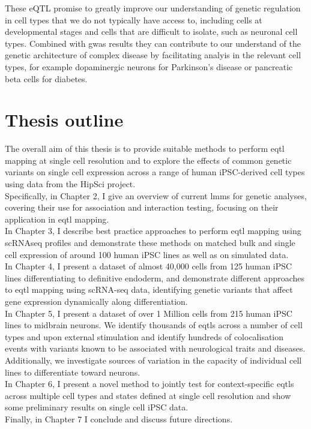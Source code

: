 These eQTL promise to greatly improve our understanding of genetic regulation in cell types that we do not typically have access to, including cells at developmental stages and cells that are difficult to isolate, such as neuronal cell types.
Combined with \gls{gwas} results they can contribute to our understand of the genetic architecture of complex disease by facilitating analyis in the relevant cell types, for example dopaminergic neurons for Parkinson's disease or pancreatic beta cells for diabetes.


\newpage

\section{Thesis outline}

The overall aim of this thesis is to provide suitable methods to perform \gls{eqtl} mapping at single cell resolution and to explore the effects of common genetic variants on single cell expression across a range of human iPSC-derived cell types using data from the HipSci project.\\

Specifically, in Chapter 2, I give an overview of current \glspl{lmm} for genetic analyses, covering their use for association and interaction testing, focusing on their application in \gls{eqtl} mapping.\\

In Chapter 3, I describe best practice approaches to perform \gls{eqtl} mapping using scRNAseq profiles and demonstrate these methods on matched bulk and single cell expression of around 100 human iPSC lines as well as on simulated data.  \\

In Chapter 4, I present a dataset of almost 40,000 cells from 125 human iPSC lines differentiating to definitive endoderm, and demonstrate different approaches to \gls{eqtl} mapping using scRNA-seq data, identifying genetic variants that affect gene expression dynamically along differentiation. \\

In Chapter 5, I present a dataset of over 1 Million cells from 215 human iPSC lines to midbrain neurons.
We identify thousands of \glspl{eqtl} across a number of cell types and upon external stimulation and identify hundreds of colocalisation events with variants known to be associated with neurological traits and diseases.
Additionally, we investigate sources of variation in the capacity of individual cell lines to differentiate toward neurons.\\

In Chapter 6, I present a novel method to jointly test for context-specific \glspl{eqtl} across multiple cell types and states defined at single cell resolution and show some preliminary results on single cell iPSC data. \\

Finally, in Chapter 7 I conclude and discuss future directions.